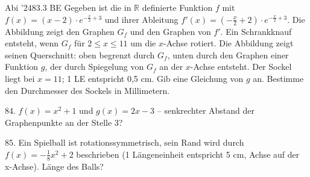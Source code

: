 \documentclass[11pt]{article}
\begin{document}
\begin{pfaufg}{Abi ’24}{83.}{3 BE}
Gegeben ist die in $\mathbb{R}$ definierte Funktion $f$ mit $f(x) = (x - 2)\cdot e^{-\tfrac{x}{2} + 3}$ und ihrer Ableitung $f'(x) = \left(-\tfrac{x}{2} + 2\right)\cdot e^{-\tfrac{x}{2} + 3}$. Die Abbildung zeigt den Graphen $G_f$ und den Graphen von $f'$. Ein Schrankknauf entsteht, wenn $G_f$ für $2 \le x \le 11$ um die $x$-Achse rotiert. Die Abbildung zeigt seinen Querschnitt: oben begrenzt durch $G_f$, unten durch den Graphen einer Funktion $g$, der durch Spiegelung von $G_f$ an der $x$-Achse entsteht. Der Sockel liegt bei $x = 11$; 1 LE entspricht 0,5 cm. Gib eine Gleichung von $g$ an. Bestimme den Durchmesser des Sockels in Millimetern.
\par\smallskip\noindent {}\par
{}
\end{pfaufg}
\pfgruppe{}
\begin{pfaufg}{}{84.}{}
$f(x) = x^2 + 1$ und $g(x) = 2x - 3$ – senkrechter Abstand der Graphenpunkte an der Stelle $3$?
\end{pfaufg}
\pfgruppe{}
\begin{pfaufg}{}{85.}{}
Ein Spielball ist rotationssymmetrisch, sein Rand wird durch $f(x) = -\tfrac{1}{8}x^2 + 2$ beschrieben (1 Längeneinheit entspricht 5 cm, Achse auf der x-Achse). Länge des Balls?
\end{pfaufg}
\end{document}
